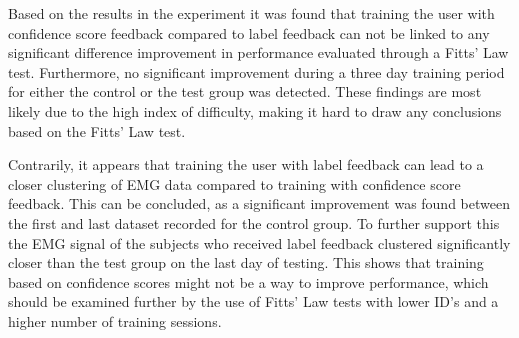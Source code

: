 Based on the results in the experiment it was found that training the user with confidence score feedback compared to label feedback can not be linked to any significant difference improvement in performance evaluated through a Fitts' Law test. Furthermore, no significant improvement during a three day training period for either the control or the test group was detected. These findings are most likely due to the high index of difficulty, making it hard to draw any conclusions based on the Fitts' Law test. 

Contrarily, it appears that training the user with label feedback can lead to a closer clustering of EMG data compared to training with confidence score feedback. This can be concluded, as a significant improvement was found between the first and last dataset recorded for the control group. To further support this the EMG signal of the subjects who received label feedback clustered significantly closer than the test group on the last day of testing. This shows that training based on confidence scores might not be a way to improve performance, which should be examined further by the use of Fitts' Law tests with lower ID's and a higher number of training sessions. 